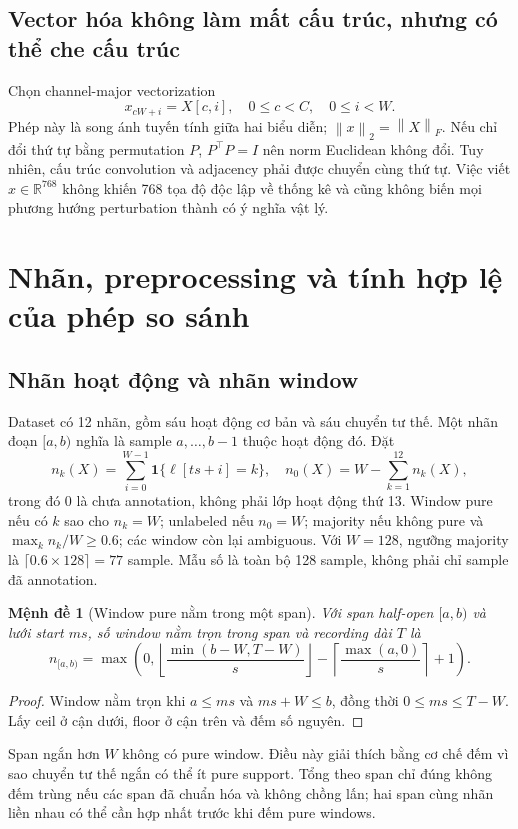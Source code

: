 \documentclass[11pt,a4paper]{article}
\newcommand{\R}{\mathbb R}
\newcommand{\norm}[1]{\left\lVert #1\right\rVert}
\newcommand{\ind}{\mathbf 1}
\newtheorem{proposition}[definition]{Mệnh đề}
\theoremstyle{remark}
\begin{document}
\subsection{Vector hóa không làm mất cấu trúc, nhưng có thể che cấu trúc}
Chọn channel-major vectorization
\begin{equation}
 x_{cW+i}=X[c,i],\quad 0\le c<C,\quad0\le i<W.
\end{equation}
Phép này là song ánh tuyến tính giữa hai biểu diễn; $\norm{x}_2=\norm{X}_F$.
Nếu chỉ đổi thứ tự bằng permutation $P$, $P^\top P=I$ nên norm Euclidean
không đổi. Tuy nhiên, cấu trúc convolution và adjacency phải được chuyển
cùng thứ tự. Việc viết $x\in\R^{768}$ không khiến 768 tọa độ độc lập về
thống kê và cũng không biến mọi phương hướng perturbation thành có ý nghĩa
vật lý.

\section{Nhãn, preprocessing và tính hợp lệ của phép so sánh}
\subsection{Nhãn hoạt động và nhãn window}
Dataset có 12 nhãn, gồm sáu hoạt động cơ bản và sáu chuyển tư thế. Một nhãn
đoạn $[a,b)$ nghĩa là sample $a,\ldots,b-1$ thuộc hoạt động đó. Đặt
\begin{equation}
 n_k(X)=\sum_{i=0}^{W-1}\ind\{\ell[ts+i]=k\},\quad
 n_0(X)=W-\sum_{k=1}^{12}n_k(X),
\end{equation}
trong đó $0$ là chưa annotation, không phải lớp hoạt động thứ 13.
Window pure nếu có $k$ sao cho $n_k=W$; unlabeled nếu $n_0=W$;
majority nếu không pure và $\max_k n_k/W\ge0.6$; các window còn lại
ambiguous. Với $W=128$, ngưỡng majority là $\lceil0.6\times128\rceil=77$
sample. Mẫu số là toàn bộ 128 sample, không phải chỉ sample đã annotation.

\begin{proposition}[Window pure nằm trong một span]
Với span half-open $[a,b)$ và lưới start $ms$, số window nằm trọn trong
span và recording dài $T$ là
\begin{equation}
 n_{[a,b)}=\max\left(0,
 \left\lfloor\frac{\min(b-W,T-W)}s\right\rfloor
 -\left\lceil\frac{\max(a,0)}s\right\rceil+1\right).
\end{equation}
\end{proposition}
\begin{proof}
Window nằm trọn khi $a\le ms$ và $ms+W\le b$, đồng thời
$0\le ms\le T-W$. Lấy ceil ở cận dưới, floor ở cận trên và đếm số nguyên.
\end{proof}
Span ngắn hơn $W$ không có pure window. Điều này giải thích bằng cơ chế
đếm vì sao chuyển tư thế ngắn có thể ít pure support. Tổng theo span chỉ
đúng không đếm trùng nếu các span đã chuẩn hóa và không chồng lấn; hai span
cùng nhãn liền nhau có thể cần hợp nhất trước khi đếm pure windows.
\end{document}
